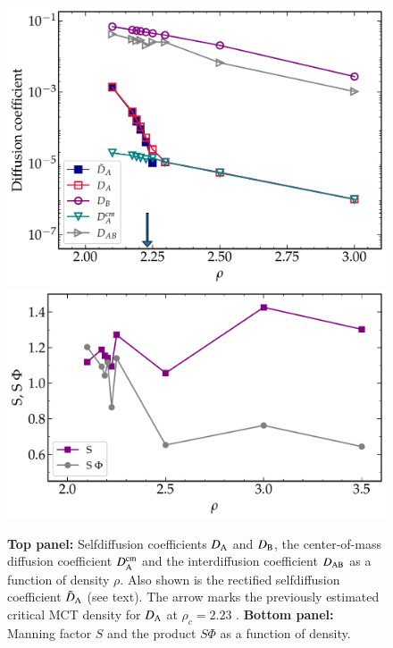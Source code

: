 %
\begin{figure}
\centering
\includegraphics[width=13cm]{figs/fig6p6top.pdf}
\includegraphics[width=13cm]{figs/fig6p6bottom.pdf}
\caption[{\em Variation of selfdiffusion coefficients, center-of-mass diffusion coefficient and interdiffusion coefficient with density. Manning factor ($S$) and the product $S \Phi$ as a function of density}]{{\bf Top panel:} Selfdiffusion coefficients $D_{\rm A}$ and $D_{\rm B}$, the center-of-mass diffusion coefficient $D_{\rm A}^{\rm cm}$  and the interdiffusion coefficient $D_{\rm AB}$ as a function of density $\rho$. Also shown is the rectified selfdiffusion coefficient $\tilde{D}_{\rm A}$ (see text). {The arrow} marks the previously estimated critical MCT density for $D_{\rm A}$ at $\rho_c=2.23$ \cite{horbach2009}.  {\bf Bottom panel:} Manning factor $S$ and the product $S \Phi$ as a function of density. \label{fig6p6}}
\end{figure}
%


